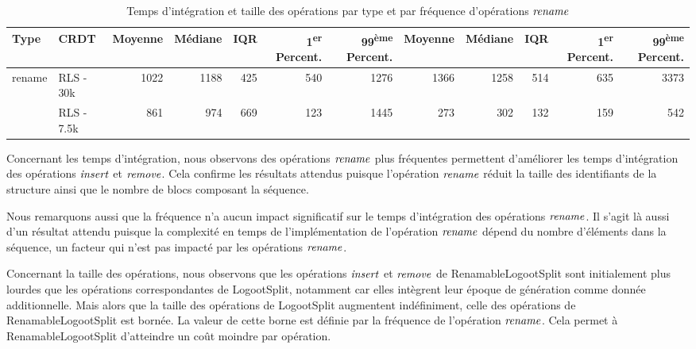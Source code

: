 \begin{table}[!ht]
{\begin{tabular}{llrrrrrrrrrr}
      Type & CRDT & Moyenne & Médiane &  IQR & 1\textsuperscript{er} Percent. & 99\textsuperscript{ème} Percent. & Moyenne & Médiane &  IQR & 1\textsuperscript{er} Percent. & 99\textsuperscript{ème} Percent. \\
      \midrule
      rename & RLS - 30k & 1022 &   1188 &  425 &        540 &        1276 &   1366 &   1258 & 514 &        635 &        3373 \\
      & RLS - 7.5k &  861 &    974 &  669 &        123 &        1445 &    273 &    302 & 132 &        159 &         542 \\
      \bottomrule
    \end{tabular}
  }
  \caption{Temps d'intégration et taille des opérations par type et par fréquence d'opérations $\mathit{rename}$}
  \label{tab:impact-frequency}
\end{table}

Concernant les temps d'intégration, nous observons des opérations $\mathit{rename}$ plus fréquentes permettent d'améliorer les temps d'intégration des opérations $\mathit{insert}$ et $\mathit{remove}$.
Cela confirme les résultats attendus puisque l'opération $\mathit{rename}$ réduit la taille des identifiants de la structure ainsi que le nombre de blocs composant la séquence.

Nous remarquons aussi que la fréquence n'a aucun impact significatif sur le temps d'intégration des opérations $\mathit{rename}$.
Il s'agit là aussi d'un résultat attendu puisque la complexité en temps de l'implémentation de l'opération $\mathit{rename}$ dépend du nombre d'éléments dans la séquence, un facteur qui n'est pas impacté par les opérations $\mathit{rename}$.

Concernant la taille des opérations, nous observons que les opérations $\mathit{insert}$ et $\mathit{remove}$ de RenamableLogootSplit sont initialement plus lourdes que les opérations correspondantes de LogootSplit, notamment car elles intègrent leur époque de génération comme donnée additionnelle.
Mais alors que la taille des opérations de LogootSplit augmentent indéfiniment, celle des opérations de RenamableLogootSplit est bornée.
La valeur de cette borne est définie par la fréquence de l'opération $\mathit{rename}$.
Cela permet à RenamableLogootSplit d'atteindre un coût moindre par opération.

